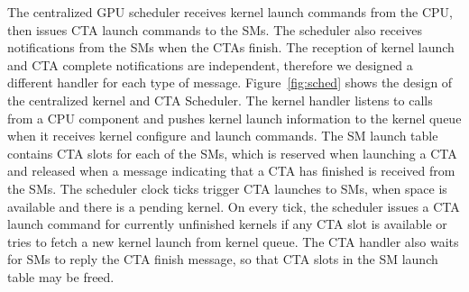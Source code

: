 The centralized GPU scheduler receives kernel launch commands from the CPU, then
issues CTA launch commands to the SMs. The scheduler also receives notifications
from the SMs when the CTAs finish. The reception of kernel launch and CTA
complete notifications are independent, therefore we designed a different
handler for each type of message. Figure~\ref{fig:sched} shows the design of the
centralized kernel and CTA Scheduler. The kernel handler listens to calls from a
CPU component and pushes kernel launch information to the kernel queue when it
receives kernel configure and launch commands. The SM launch table contains CTA
slots for each of the SMs, which is reserved when launching a CTA and released when a
message indicating that a CTA has finished is received from the SMs. The
scheduler clock ticks trigger CTA launches to SMs, when space is available and
there is a pending kernel. On every tick, the scheduler issues a CTA launch
command for currently unfinished kernels if any CTA slot is available or tries
to fetch a new kernel launch from kernel queue. The CTA handler also waits for
SMs to reply the CTA finish message, so that CTA slots in the SM launch table may
be freed.
